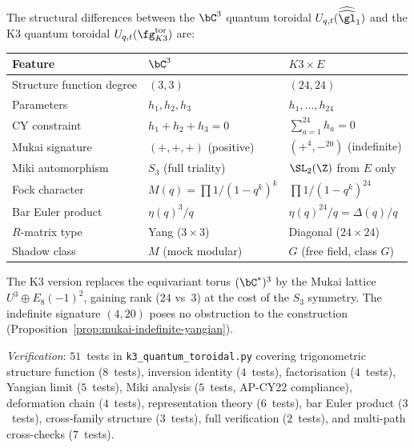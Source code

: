 \begin{remark}
\label{rem:k3-qt-vs-c3}
The structural differences between the $\bC^3$ quantum toroidal
$U_{q,t}(\widehat{\widehat{\gl}}_1)$ and the K3 quantum toroidal
$U_{q,t}(\fg_{K3}^{\mathrm{tor}})$ are:
\begin{center}
\small
\renewcommand{\arraystretch}{1.3}
\begin{tabular}{lll}
\toprule
\textbf{Feature} & \textbf{$\bC^3$} & \textbf{$K3 \times E$} \\
\midrule
Structure function degree & $(3,3)$ & $(24,24)$ \\
Parameters & $h_1, h_2, h_3$ & $h_1, \ldots, h_{24}$ \\
CY constraint & $h_1 + h_2 + h_3 = 0$ & $\sum_{a=1}^{24} h_a = 0$ \\
Mukai signature & $(+,+,+)$ (positive) & $(+^4, -^{20})$ (indefinite) \\
Miki automorphism & $S_3$ (full triality) & $\SL_2(\Z)$ from $E$ only \\
Fock character & $M(q) = \prod 1/(1-q^k)^k$ & $\prod 1/(1-q^k)^{24}$ \\
Bar Euler product & $\eta(q)^3/q$ & $\eta(q)^{24}/q = \Delta(q)/q$ \\
$R$-matrix type & Yang ($3 \times 3$) & Diagonal ($24 \times 24$) \\
Shadow class & $M$ (mock modular) & $G$ (free field, class $G$) \\
\bottomrule
\end{tabular}
\end{center}
The K3 version replaces the equivariant torus $(\bC^*)^3$ by the Mukai
lattice $U^3 \oplus E_8(-1)^2$, gaining rank ($24$ vs~$3$) at the cost
of the $S_3$ symmetry.  The indefinite signature $(4,20)$ poses no
obstruction to the construction (Proposition~\ref{prop:mukai-indefinite-yangian}).
\end{remark}

\noindent\textit{Verification}: $51$~tests in
\texttt{k3\_quantum\_toroidal.py}
covering trigonometric structure function ($8$~tests), inversion
identity ($4$~tests), factorisation ($4$~tests), Yangian limit
($5$~tests), Miki analysis ($5$~tests, AP-CY22 compliance),
deformation chain ($4$~tests), representation theory ($6$~tests),
bar Euler product ($3$~tests), cross-family structure ($3$~tests),
full verification ($2$~tests), and multi-path cross-checks ($7$~tests).


